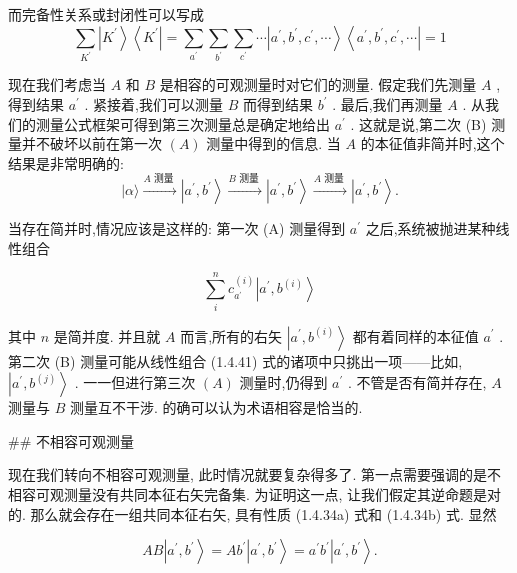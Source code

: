 \documentclass[lang=cn,newtx,10pt,scheme=chinese,thmcnt=section]{elegantbook}
\begin{document}
而完备性关系或封闭性可以写成
\begin{equation}
	\mathop{\sum }\limits_{{K}^{\prime }}\left| {K}^{\prime }\right\rangle \left\langle {K}^{\prime }\right| = \mathop{\sum }\limits_{{a}^{\prime }}\mathop{\sum }\limits_{{b}^{\prime }}\mathop{\sum }\limits_{{c}^{\prime }}\cdots \left| {{a}^{\prime },{b}^{\prime },{c}^{\prime },\cdots }\right\rangle \left\langle {{a}^{\prime },{b}^{\prime },{c}^{\prime },\cdots }\right| = 1
\end{equation}

现在我们考虑当 $A$ 和 $B$ 是相容的可观测量时对它们的测量. 假定我们先测量 $A$ ,得到结果 ${a}^{\prime }$ . 紧接着,我们可以测量 $B$ 而得到结果 ${b}^{\prime }$ . 最后,我们再测量 $A$ . 从我们的测量公式框架可得到第三次测量总是确定地给出 ${a}^{\prime }$ . 这就是说,第二次 (B) 测量并不破坏以前在第一次 $\left( A\right)$ 测量中得到的信息. 当 $A$ 的本征值非简并时,这个结果是非常明确的:
\begin{equation}
	| {\alpha \rangle \xrightarrow[]{A\text{ 测量 }}\left| {{a}^{\prime },{b}^{\prime }}\right\rangle \xrightarrow[]{B\text{ 测量 }}\left| {{a}^{\prime },{b}^{\prime }}\right\rangle \xrightarrow[]{A\text{ 测量 }}\left| {{a}^{\prime },{b}^{\prime }}\right\rangle .}
\end{equation}

当存在简并时,情况应该是这样的: 第一次 (A) 测量得到 ${a}^{\prime }$ 之后,系统被抛进某种线性组合

$$
\mathop{\sum }\limits_{i}^{n}{c}_{{a}^{\prime }}^{\left( i\right) }\left| {{a}^{\prime },{b}^{\left( i\right) }}\right\rangle \tag{1.4.41}
$$

其中 $n$ 是简并度. 并且就 $A$ 而言,所有的右矢 $\left| {{a}^{\prime },{b}^{\left( i\right) }}\right\rangle$ 都有着同样的本征值 ${a}^{\prime }$ . 第二次 (B) 测量可能从线性组合 (1.4.41) 式的诸项中只挑出一项——比如, $\left| {{a}^{\prime },{b}^{\left( j\right) }}\right\rangle$ . 一一但进行第三次 $\left( A\right)$ 测量时,仍得到 ${a}^{\prime }$ . 不管是否有简并存在, $A$ 测量与 $B$ 测量互不干涉. 的确可以认为术语相容是恰当的.

## 不相容可观测量

现在我们转向不相容可观测量, 此时情况就要复杂得多了. 第一点需要强调的是不相容可观测量没有共同本征右矢完备集. 为证明这一点, 让我们假定其逆命题是对的. 那么就会存在一组共同本征右矢, 具有性质 (1.4.34a) 式和 (1.4.34b) 式. 显然

$$
{AB}\left| {{a}^{\prime },{b}^{\prime }}\right\rangle = A{b}^{\prime }\left| {{a}^{\prime },{b}^{\prime }}\right\rangle = {a}^{\prime }{b}^{\prime }\left| {{a}^{\prime },{b}^{\prime }}\right\rangle . \tag{1.4.42}
$$
\end{document}
